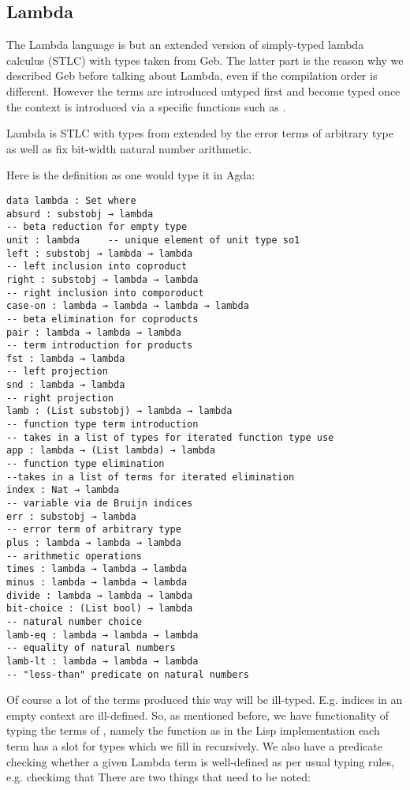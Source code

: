 \subsection{Lambda}

The Lambda language is but an extended version of simply-typed lambda calculus (STLC) with types taken from Geb. The latter part is the reason why we described Geb before talking about Lambda, even if the compilation order is different. However the terms are introduced untyped first and become typed once the context is introduced via a specific functions such as .
\begin{definition}
    Lambda is STLC with types from \gebobj extended by the error terms \lamerr of arbitrary type as well as fix bit-width natural number arithmetic.
\end{definition}

Here is the definition as one would type it in Agda:

\begin{verbatim}
data lambda : Set where
absurd : substobj → lambda   
-- beta reduction for empty type
unit : lambda     -- unique element of unit type so1
left : substobj → lambda → lambda  
-- left inclusion into coproduct
right : substobj → lambda → lambda 
-- right inclusion into comporoduct
case-on : lambda → lambda → lambda → lambda 
-- beta elimination for coproducts
pair : lambda → lambda → lambda 
-- term introduction for products
fst : lambda → lambda   
-- left projection
snd : lambda → lambda   
-- right projection
lamb : (List substobj) → lambda → lambda 
-- function type term introduction
-- takes in a list of types for iterated function type use
app : lambda → (List lambda) → lambda 
-- function type elimination
--takes in a list of terms for iterated elimination
index : Nat → lambda  
-- variable via de Bruijn indices
err : substobj → lambda 
-- error term of arbitrary type
plus : lambda → lambda → lambda 
-- arithmetic operations
times : lambda → lambda → lambda
minus : lambda → lambda → lambda
divide : lambda → lambda → lambda
bit-choice : (List bool) → lambda 
-- natural number choice
lamb-eq : lambda → lambda → lambda 
-- equality of natural numbers
lamb-lt : lambda → lambda → lambda 
-- "less-than" predicate on natural numbers
\end{verbatim}

Of course a lot of the terms produced this way will be ill-typed. E.g. indices in an empty context are ill-defined. So, as mentioned before, we have functionality of typing the terms of , namely the function  as in the Lisp implementation each term has a slot for types which we fill in recursively. We also have a  predicate checking whether a given Lambda term is well-defined as per usual typing rules, e.g. checkimg that  There are two things that need to be noted: 

